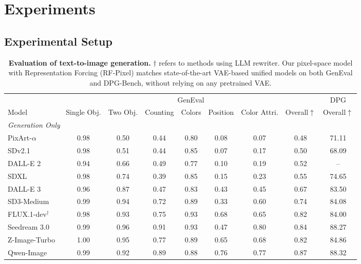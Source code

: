 \section{Experiments}

\subsection{Experimental Setup}
\label{sec:exp_setup}

\begin{table}[t]
\centering
\small
\setlength{\tabcolsep}{2.8pt}
\caption{\textbf{Evaluation of text-to-image generation.} $\dagger$ refers to methods using LLM rewriter. Our pixel-space model with Representation Forcing (RF-Pixel) matches state-of-the-art VAE-based unified models on both GenEval and DPG-Bench, without relying on any pretrained VAE.}
\label{tab:geneval}
\begin{tabular}{l|ccccccc|c}
\toprule
& \multicolumn{7}{c|}{GenEval} & DPG \\
\cmidrule(lr){2-8} \cmidrule(lr){9-9}
Model & Single Obj. & Two Obj. & Counting & Colors & Position & Color Attri. & Overall$\uparrow$ & Overall$\uparrow$ \\
\midrule
\multicolumn{9}{l}{\textit{Generation Only}} \\
\midrule
PixArt-$\alpha$~\cite{pixart}     & 0.98 & 0.50 & 0.44 & 0.80 & 0.08 & 0.07 & 0.48 & 71.11 \\
SDv2.1~\cite{stable_diff}               & 0.98 & 0.51 & 0.44 & 0.85 & 0.07 & 0.17 & 0.50 & 68.09 \\
DALL-E 2~\cite{dalle2}            & 0.94 & 0.66 & 0.49 & 0.77 & 0.10 & 0.19 & 0.52 & -- \\
SDXL~\cite{sdxl}                  & 0.98 & 0.74 & 0.39 & 0.85 & 0.15 & 0.23 & 0.55 & 74.65 \\
DALL-E 3~\cite{dalle3}            & 0.96 & 0.87 & 0.47 & 0.83 & 0.43 & 0.45 & 0.67 & 83.50 \\
SD3-Medium~\cite{sd3}             & 0.99 & 0.94 & 0.72 & 0.89 & 0.33 & 0.60 & 0.74 & 84.08 \\
FLUX.1-dev$^\dagger$~\cite{flux}  & 0.98 & 0.93 & 0.75 & 0.93 & 0.68 & 0.65 & 0.82 & 84.00 \\
Seedream 3.0~\cite{seedream}      & 0.99 & 0.96 & 0.91 & 0.93 & 0.47 & 0.80 & 0.84 & 88.27 \\
Z-Image-Turbo~\cite{zimageturbo}  & 1.00 & 0.95 & 0.77 & 0.89 & 0.65 & 0.68 & 0.82 & 84.86 \\
Qwen-Image~\cite{qwenimage}       & 0.99 & 0.92 & 0.89 & 0.88 & 0.76 & 0.77 & 0.87 & 88.32 \\

\end{tabular}
\end{table}
